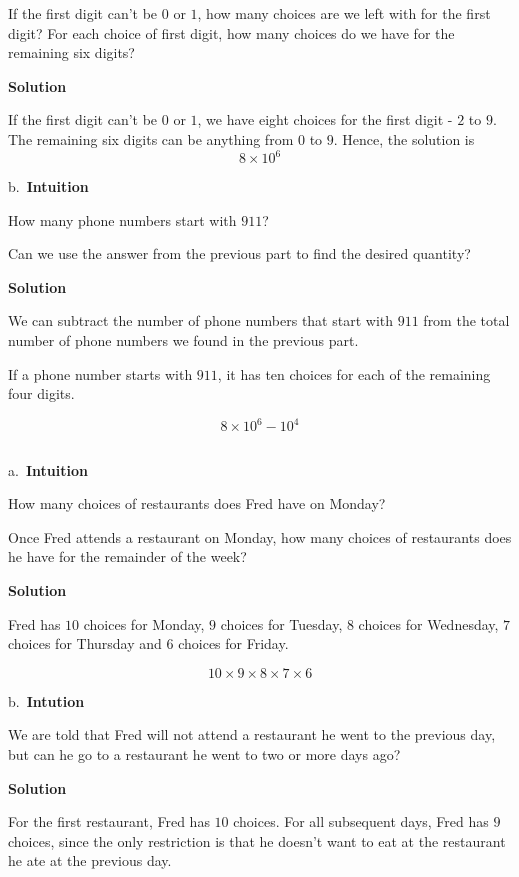 \documentclass[]{book}
\begin{document}
If the first digit can't be \(0\) or \(1\), how many choices are we left
with for the first digit? For each choice of first digit, how many
choices do we have for the remaining six digits?

 \textbf{Solution}

If the first digit can't be \(0\) or \(1\), we have eight choices for
the first digit - \(2\) to \(9\). The remaining six digits can be
anything from \(0\) to \(9\). Hence, the solution is
\[ 8 \times 10^{6} \]

b.~\textbf{Intuition}

How many phone numbers start with \(911\)?

Can we use the answer from the previous part to find the desired
quantity?

 \textbf{Solution}

We can subtract the number of phone numbers that start with \(911\) from
the total number of phone numbers we found in the previous part.

If a phone number starts with \(911\), it has ten choices for each of
the remaining four digits.

\[ 8 \times 10^{6} - 10^{4} \]

\subsection{}\label{section-2}

a.~\textbf{Intuition}

How many choices of restaurants does Fred have on Monday?

Once Fred attends a restaurant on Monday, how many choices of
restaurants does he have for the remainder of the week?

 \textbf{Solution}

Fred has \(10\) choices for Monday, \(9\) choices for Tuesday, \(8\)
choices for Wednesday, \(7\) choices for Thursday and \(6\) choices for
Friday.

\[ 10 \times 9 \times 8 \times 7 \times 6 \]

b.~\textbf{Intution}

We are told that Fred will not attend a restaurant he went to the
previous day, but can he go to a restaurant he went to two or more days
ago?

 \textbf{Solution}

For the first restaurant, Fred has \(10\) choices. For all subsequent
days, Fred has \(9\) choices, since the only restriction is that he
doesn't want to eat at the restaurant he ate at the previous day.
\end{document}
